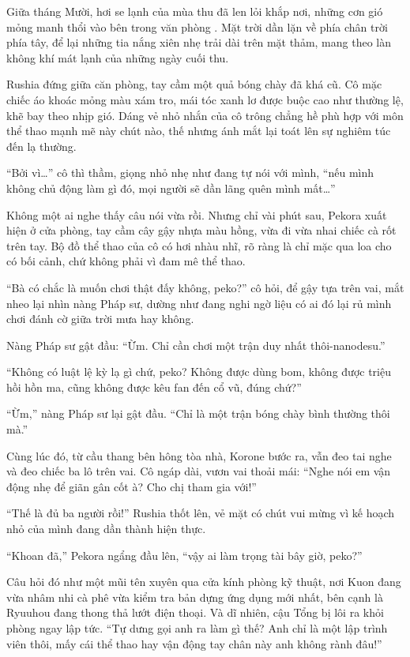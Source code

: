 \documentclass[../main.tex]{subfiles}
\begin{document}
Giữa tháng Mười, hơi se lạnh của mùa thu đã len lỏi khắp nơi, những cơn gió mỏng manh thổi vào bên trong văn phòng \hll. Mặt trời dần lặn về phía chân trời phía tây, để lại những tia nắng xiên nhẹ trải dài trên mặt thảm, mang theo làn không khí mát lạnh của những ngày cuối thu.

Rushia đứng giữa căn phòng, tay cầm một quả bóng chày đã khá cũ. Cô mặc chiếc áo khoác mỏng màu xám tro, mái tóc xanh lơ được buộc cao như thường lệ, khẽ bay theo nhịp gió. Dáng vẻ nhỏ nhắn của cô trông chẳng hề phù hợp với môn thể thao mạnh mẽ này chút nào, thế nhưng ánh mắt lại toát lên sự nghiêm túc đến lạ thường.

``Bởi vì\dots'' cô thì thầm, giọng nhỏ nhẹ như đang tự nói với mình, ``nếu mình không chủ động làm gì đó, mọi người sẽ dần lãng quên mình mất\dots''

Không một ai nghe thấy câu nói vừa rồi. Nhưng chỉ vài phút sau, Pekora xuất hiện ở cửa phòng, tay cầm cây gậy nhựa màu hồng, vừa đi vừa nhai chiếc cà rốt trên tay. Bộ đồ thể thao của cô có hơi nhàu nhĩ, rõ ràng là chỉ mặc qua loa cho có bối cảnh, chứ không phải vì đam mê thể thao.

``Bà có chắc là muốn chơi thật đấy không, peko?'' cô hỏi, để gậy tựa trên vai, mắt nheo lại nhìn nàng Pháp sư, dường như đang nghi ngờ liệu có ai đó lại rủ mình chơi đánh cờ giữa trời mưa hay không.

Nàng Pháp sư gật đầu: ``Ừm. Chỉ cần chơi một trận duy nhất thôi-nanodesu.''

``Không có luật lệ kỳ lạ gì chứ, peko? Không được dùng bom, không được triệu hồi hồn ma, cũng không được kêu fan đến cổ vũ, đúng chứ?''

``Ừm,'' nàng Pháp sư lại gật đầu. ``Chỉ là một trận bóng chày bình thường thôi mà.''

Cùng lúc đó, từ cầu thang bên hông tòa nhà, Korone bước ra, vẫn đeo tai nghe và đeo chiếc ba lô trên vai. Cô ngáp dài, vươn vai thoải mái: ``Nghe nói em vận động nhẹ để giãn gân cốt à? Cho chị tham gia với!''

``Thế là đủ ba người rồi!'' Rushia thốt lên, vẻ mặt có chút vui mừng vì kế hoạch nhỏ của mình đang dần thành hiện thực.

``Khoan đã,'' Pekora ngẩng đầu lên, ``vậy ai làm trọng tài bây giờ, peko?''

Câu hỏi đó như một mũi tên xuyên qua cửa kính phòng kỹ thuật, nơi Kuon đang vừa nhâm nhi cà phê vừa kiểm tra bản dựng ứng dụng mới nhất, bên cạnh là Ryuuhou đang thong thả lướt điện thoại. Và dĩ nhiên, cậu Tổng bị lôi ra khỏi phòng ngay lập tức. ``Tự dưng gọi anh ra làm gì thế? Anh chỉ là một lập trình viên thôi, mấy cái thể thao hay vận động tay chân này anh không rành đâu!''
\end{document}
